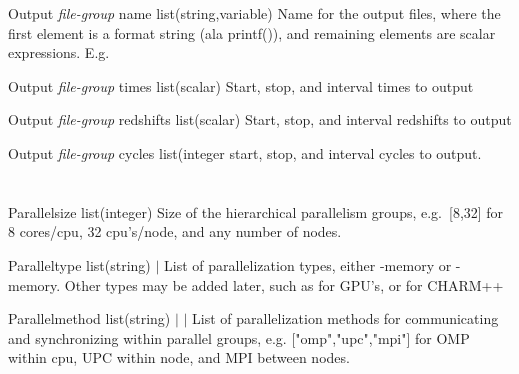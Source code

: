 \documentclass{book}
\begin{document}
\Parameter
{Output}
{\textit{file-group}}
{name}
{list(string,variable)}
{}
{Name for the output files, where the first element is a format string (ala printf()), and remaining elements are scalar expressions. E.g. \code{["wave\_pool-t=\%3.1f.data", t]}}
{}
{}

\Parameter
{Output}
{\textit{file-group}}
{times}
{list(scalar)}
{}
{Start, stop, and interval times to output}
{}
{}

\Parameter
{Output}
{\textit{file-group}}
{redshifts}
{list(scalar)}
{}
{Start, stop, and interval redshifts to output}
{}
{}

\Parameter
{Output}
{\textit{file-group}}
{cycles}
{list(integer}
{}
{start, stop, and interval cycles to output. }
{}
{}

\section{}

\Parameter
{Parallel}{}{size}
{list(integer)}{}
{Size of the hierarchical parallelism groups, e.g.~[8,32] for 8 cores/cpu, 32 cpu's/node, and any number of nodes.}
{}
{}

\Parameter
{Parallel}{}{type}
{list(string)}
{ $|$ }
{List of parallelization types, either -memory or -memory. Other types may be added later, such as  for GPU's, or  for CHARM++}
{}
{}

\Parameter
{Parallel}{}{method}
{list(string)}
{ $|$  $|$ }
{List of parallelization methods for communicating and synchronizing within parallel groups, e.g. ["omp","upc","mpi"] for OMP within cpu, UPC within node, and MPI between nodes.}
{}
{}
\end{document}
